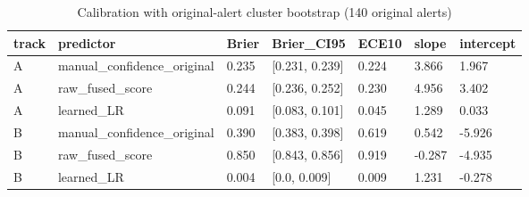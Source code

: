 \begin{table}[t]\centering\caption{Calibration with original-alert cluster bootstrap (140 original alerts)}
\begin{tabular}{lllllll}\hline
track & predictor & Brier & Brier\_CI95 & ECE10 & slope & intercept \\\hline
A & manual\_confidence\_original & 0.235 & [0.231, 0.239] & 0.224 & 3.866 & 1.967 \\
A & raw\_fused\_score & 0.244 & [0.236, 0.252] & 0.230 & 4.956 & 3.402 \\
A & learned\_LR & 0.091 & [0.083, 0.101] & 0.045 & 1.289 & 0.033 \\
B & manual\_confidence\_original & 0.390 & [0.383, 0.398] & 0.619 & 0.542 & -5.926 \\
B & raw\_fused\_score & 0.850 & [0.843, 0.856] & 0.919 & -0.287 & -4.935 \\
B & learned\_LR & 0.004 & [0.0, 0.009] & 0.009 & 1.231 & -0.278 \\
\hline\end{tabular}\end{table}
